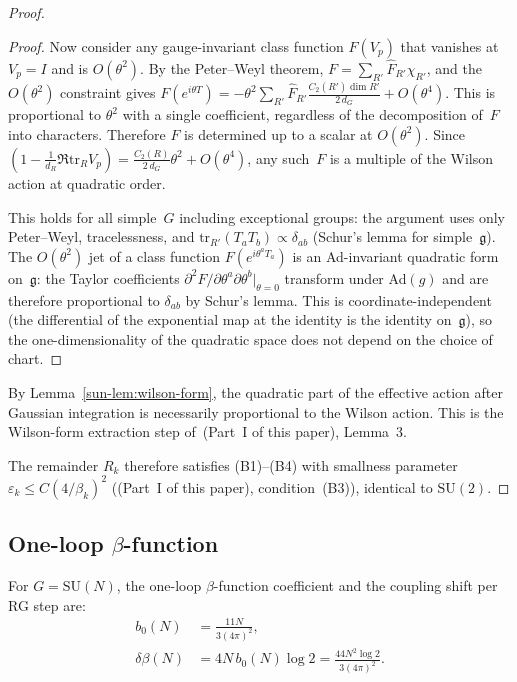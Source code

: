 \documentclass[11pt]{article}
\theoremstyle{definition}
\newcommand{\SU}{\mathrm{SU}}
\newcommand{\tr}{\mathrm{tr}}
\newcommand{\fg}{\mathfrak{g}}
\begin{document}
\begin{proof}
\begin{proof}
Now consider any gauge-invariant class function
$F(V_p)$ that vanishes at $V_p=I$ and is $O(\theta^2)$.
By the Peter--Weyl theorem,
$F=\sum_{R'}\hat{F}_{R'}\chi_{R'}$, and the
$O(\theta^2)$ constraint gives
$F(e^{i\theta T})=-\theta^2\sum_{R'}\hat{F}_{R'}
\frac{C_2(R')\dim R'}{2\,d_G}+O(\theta^4)$.
This is proportional to $\theta^2$ with a single
coefficient, regardless of the decomposition
of~$F$ into characters.  Therefore $F$ is
determined up to a scalar at $O(\theta^2)$.
Since $(1-\frac{1}{d_R}\Re\tr_R V_p)
=\frac{C_2(R)}{2\,d_G}\theta^2+O(\theta^4)$,
any such~$F$ is a multiple of the Wilson action at
quadratic order.

This holds for all simple~$G$ including exceptional
groups: the argument uses only Peter--Weyl,
tracelessness, and
$\tr_{R'}(T_a T_b)\propto\delta_{ab}$
(Schur's lemma for simple~$\fg$).
The $O(\theta^2)$ jet of a class function
$F(e^{i\theta^a T_a})$ is an Ad-invariant
quadratic form on~$\fg$: the Taylor coefficients
$\partial^2 F/\partial\theta^a\partial\theta^b|_{\theta=0}$
transform under Ad$(g)$ and are therefore proportional
to $\delta_{ab}$ by Schur's lemma.  This is
coordinate-independent (the differential of the
exponential map at the identity is the identity
on~$\fg$), so the one-dimensionality of the quadratic
space does not depend on the choice of chart.
\end{proof}

By Lemma~\ref{sun-lem:wilson-form}, the quadratic part of
the effective action after Gaussian integration is
necessarily proportional to the Wilson action.  This is
the Wilson-form extraction step of~(Part~I of this paper),
Lemma~3.

The remainder $R_k$ therefore satisfies (B1)--(B4) with
smallness parameter $\varepsilon_k\le C(4/\beta_k)^2$
((Part~I of this paper), condition~(B3)),
identical to $\SU(2)$.
\end{proof}



\subsection{One-loop $\beta$-function}

For $G=\SU(N)$, the one-loop $\beta$-function coefficient
and the coupling shift per RG step are:
\begin{align}
b_0(N)&=\frac{11N}{3(4\pi)^2},\label{sun-eq:b0}\\
\delta\beta(N)&=4N\,b_0(N)\log 2
=\frac{44N^2\log 2}{3(4\pi)^2}.\label{sun-eq:deltabeta}
\end{align}
\end{document}
